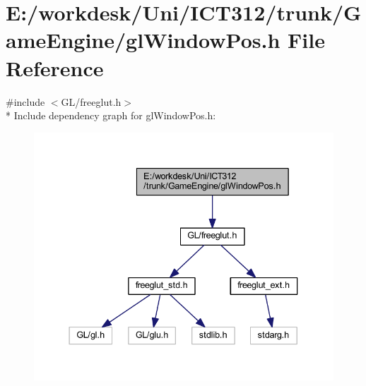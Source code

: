 \section{E\+:/workdesk/\+Uni/\+I\+C\+T312/trunk/\+Game\+Engine/gl\+Window\+Pos.h File Reference}
\label{gl_window_pos_8h}
{\ttfamily \#include $<$G\+L/freeglut.\+h$>$}\\*
Include dependency graph for gl\+Window\+Pos.\+h\+:\nopagebreak
\begin{figure}[H]
\begin{center}
\leavevmode
\includegraphics[width=337pt]{d2/d25/gl_window_pos_8h__incl}
\end{center}
\end{figure}

